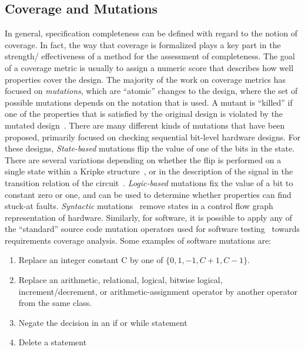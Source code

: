 \subsection{Coverage and Mutations}
In general, specification completeness can be defined with
regard to the notion of coverage. In fact, the way that coverage
is formalized plays a key part in the strength/ effectiveness of
a method for the assessment of completeness. The goal of a coverage metric is usually to assign a numeric score that describes how well properties cover the design. The majority of the work on coverage metrics has focused on {\em mutations}, which are ``atomic'' changes to the design, where the set of possible mutations depends on the notation that is used.  A mutant is ``killed'' if one of the properties that is satisfied by the original design is violated by the mutated design~\cite{chockler_coverage_2003,chockler2001practical,chockler2010coverage,Kupferman:2006:SCF,kupferman_theory_2008}.  There are many different kinds of mutations that have been proposed, primarily focused on checking sequential bit-level hardware designs.  For these designs, {\em State-based} mutations flip the value of one of the bits in the state.  There are several variations depending on whether the flip is performed on a single state within a Kripke structure~\cite{hoskote1999coverage}, or in the description of the signal in the transition relation of the circuit~\cite{chockler2001practical}.  {\em Logic-based} mutations fix the value of a bit to constant zero or one, and can be used to determine whether properties can find stuck-at faults.  {\em Syntactic} mutations~\cite{chockler_coverage_2003} remove states in a control flow graph representation of hardware.  Similarly, for software, it is possible to apply any of the ``standard'' source code mutation operators used for software testing~\cite{Andrews06:mutation} towards requirements coverage analysis.  Some examples of software mutations are:
\begin{enumerate}
    \item Replace an integer constant C by one of $\{0, 1, -1, C + 1, C - 1\}$.
    \item Replace an arithmetic, relational, logical, bitwise logical, increment/decrement, or arithmetic-assignment operator by another operator from the same class.
    \item Negate the decision in an if or while statement
    \item Delete a statement
\end{enumerate}

